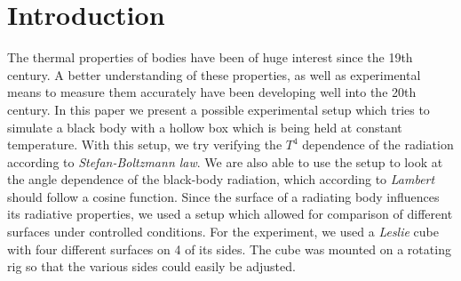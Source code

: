\documentclass[a4paper,10pt,twocolumn]{article}
\begin{document}
    \section{Introduction}\label{sec:introdction}
    The thermal properties of bodies have been of huge interest since the 19th century.
    A better understanding of these properties, as well as experimental means to measure them accurately have been developing well into the 20th century.
    In this paper we present a possible experimental setup which tries to simulate a black body with a hollow box which is being held at constant temperature.
    With this setup, we try verifying the $T^4$ dependence of the radiation according to \textit{Stefan-Boltzmann law}.
    We are also able to use the setup to look at the angle dependence of the black-body radiation, which according to \textit{Lambert} should follow a cosine function.
    Since the surface of a radiating body influences its radiative properties, we used a setup which allowed for comparison of different surfaces under controlled conditions.
    For the experiment, we used a \textit{Leslie} cube with four different surfaces on 4 of its sides.
    The cube was mounted on a rotating rig so that the various sides could easily be adjusted.
    
    
    
    
\end{document}
